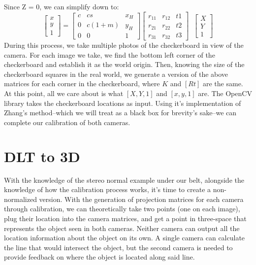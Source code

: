 \documentclass[12pt,twoside]{reedthesis}
\begin{document}

Since Z = 0, we can simplify down to:
\[\begin{bmatrix}x \\ y \\ 1\end{bmatrix} = \begin{bmatrix}c & cs & x_H \\ 0 & c(1+m) & y_H \\ 0 & 0 & 1\end{bmatrix} \begin{bmatrix} r_{11}&r_{12}&t{1}\\r_{21}&r_{22}&t{2}\\r_{31}&r_{32}&t{3}\end{bmatrix}\;\;\begin{bmatrix}X \\ Y \\ 1\end{bmatrix} \]
During this process, we take multiple photos of the checkerboard in view of the camera. For each image we take, we find the bottom left corner of the checkerboard and establish it as the world origin. Then, knowing the size of the checkerboard squares in the real world, we generate a version of the above matrices for each corner in the checkerboard, where $K$ and $[R t]$ are the same. At this point, all we care about is what $[X, Y, 1]$ and $[x, y, 1]$ are. The OpenCV library takes the checkerboard locations as input. Using it's implementation of Zhang's method--which we will treat as a black box for brevity's sake--we can complete our calibration of both cameras.

\section{DLT to 3D}
With the knowledge of the stereo normal example under our belt, alongside the knowledge of how the calibration process works, it's time to create a non-normalized version. With the generation of projection matrices for each camera through calibration, we can theoretically take two points (one on each image), plug their location into the camera matrices, and get a point in three-space that represents the object seen in both cameras. Neither camera can output all the location information about the object on its own. A single camera can calculate the line that would intersect the object, but the second camera is needed to provide feedback on where the object is located along said line.
\end{document}
